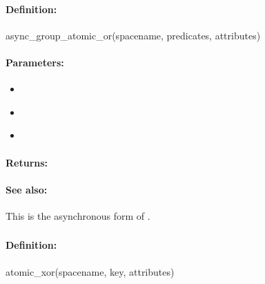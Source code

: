 \paragraph{Definition:}
\begin{rubycode}
async_group_atomic_or(spacename, predicates, attributes)
\end{rubycode}

\paragraph{Parameters:}
\begin{itemize}[noitemsep]
\item {}\\

\item {}\\

\item {}\\

\end{itemize}

\paragraph{Returns:}


\paragraph{See also:}  This is the asynchronous form of .

\pagebreak
\subsubsection{}
\label{api:ruby:atomic_xor}


\paragraph{Definition:}
\begin{rubycode}
atomic_xor(spacename, key, attributes)
\end{rubycode}

